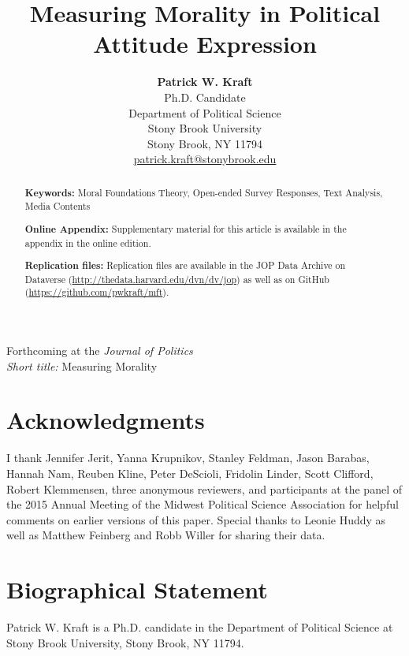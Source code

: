 \documentclass[12pt]{article}
\title{Measuring Morality in Political Attitude Expression}
\author{\textbf{Patrick W. Kraft}\\Ph.D. Candidate\\Department of Political Science\\Stony Brook University\\ Stony Brook, NY 11794\\\href{mailto:patrick.kraft@stonybrook.edu}{patrick.kraft@stonybrook.edu}}
\date{}
\begin{document}
\maketitle
\doublespacing
\thispagestyle{empty}

\begin{center}\large
Forthcoming at the \textit{Journal of Politics}\\
\textit{Short title:} Measuring Morality
\end{center}

\clearpage\thispagestyle{empty}
\begin{abstract}


\vspace{\baselineskip}
\noindent \textbf{Keywords:} Moral Foundations Theory, Open-ended Survey Responses, Text Analysis, Media Contents

\vspace{\baselineskip}
\noindent \textbf{Online Appendix:} Supplementary material for this article is available in the appendix in the online edition.

\vspace{\baselineskip}
\noindent \textbf{Replication files:} Replication files are available in the JOP Data Archive on Dataverse (\url{http://thedata.harvard.edu/dvn/dv/jop}) as well as on GitHub (\url{https://github.com/pwkraft/mft}).
\end{abstract}


\newpage
\setcounter{page}{1}





\section*{Acknowledgments}
I thank Jennifer Jerit, Yanna Krupnikov, Stanley Feldman, Jason Barabas, Hannah Nam, Reuben Kline, Peter DeScioli, Fridolin Linder, Scott Clifford, 
Robert Klemmensen, three anonymous reviewers, and participants at the panel of the 2015 Annual Meeting of the Midwest Political Science Association for helpful comments on earlier versions of this paper. Special thanks to Leonie Huddy as well as Matthew Feinberg and Robb Willer for sharing their data.

\section*{Biographical Statement}

Patrick W. Kraft is a Ph.D. candidate in the Department of Political Science at Stony Brook University, Stony Brook, NY 11794.
\end{document}
